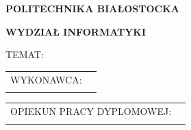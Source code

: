 %
\begin{center}
	\fontsize{20pt}{20pt}\selectfont
	\textbf{POLITECHNIKA BIAŁOSTOCKA}
	\vspace{1.0cm}

	\fontsize{14pt}{14pt}\selectfont
	\textbf{WYDZIAŁ INFORMATYKI}
	\vspace{4.0cm}

	\fontsize{18pt}{18pt}\selectfont
	\thesisType
	\fontsize{16pt}{16pt}\selectfont

	\vspace{0.8cm}

	\fontsize{14pt}{14pt}\selectfont

	\vspace{1.6cm}

	TEMAT: \topicPL

	\vspace{1.6cm}

\end{center}
\fontsize{14pt}{14pt}\selectfont

\vspace{3,4cm}

\begin{flushright}
	\begin{tabular}{rl}
		WYKONAWCA: & \thesisAuthor \\
		           &               \\
	\end{tabular}
	\vfill
\end{flushright}

\begin{flushleft}
	\begin{tabular}{rl}
		OPIEKUN PRACY DYPLOMOWEJ: & \promotor \\
		                          &           \\
	\end{tabular}
\end{flushleft}

\vspace{2cm}


